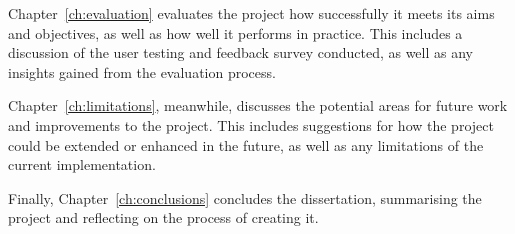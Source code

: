 \documentclass[../main.tex]{subfiles}
\begin{document}
        Chapter~\ref{ch:evaluation} evaluates the project how successfully it meets its
            aims and objectives, as well as how well it performs in practice.
        This includes a discussion of the user testing and feedback survey conducted,
            as well as any insights gained from the evaluation process.

        Chapter~\ref{ch:limitations}, meanwhile, discusses the potential areas for
            future work and improvements to the project.
        This includes suggestions for how the project could be extended or enhanced in
            the future, as well as any limitations of the current implementation.

        Finally, Chapter~\ref{ch:conclusions} concludes the dissertation, summarising
            the project and reflecting on the process of creating it.
\end{document}
